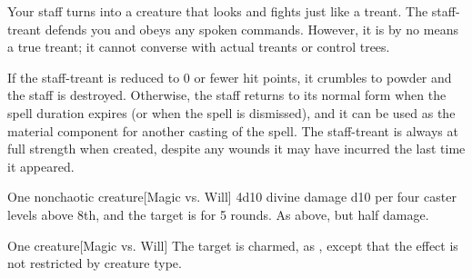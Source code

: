 \spelldur{\durmed \dismissable}
\spellline
\spelleffect Your staff turns into a creature that looks and fights just like a treant. The staff-treant defends you and obeys any spoken commands. However, it is by no means a true treant; it cannot converse with actual treants or control trees.

If the staff-treant is reduced to 0 or fewer hit points, it crumbles to powder and the staff is destroyed. Otherwise, the staff returns to its normal form when the spell duration expires (or when the spell is dismissed), and it can be used as the material component for another casting of the spell. The staff-treant is always at full strength when created, despite any wounds it may have incurred the last time it appeared.
\spellline
{}

\spellrng{\rngmed}
\begin{spelltarget}{One nonchaotic creature}[Magic vs. Will]
    \spellsuccess 4d10 divine damage \add d10 per four caster levels above 8th, and the target is \bewildered for 5 rounds.
    \spellfailure As above, but half damage.
\end{spelltarget}

\spellrng{\rngmed}
\spelldur{\durlong}
\begin{spelltarget}{One creature}[Magic vs. Will]
    \spellsuccess The target is charmed, as , except that the effect is not restricted by creature type.
\end{spelltarget}

